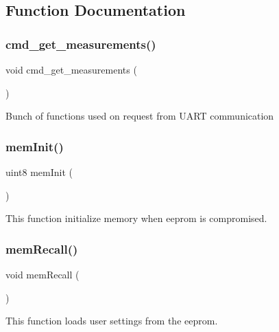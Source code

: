 \subsection{Function Documentation}
\mbox{\label{command__processing_8c_af5ccd403f1d3e49c97bafd6e7713cff3}} 
\subsubsection{cmd\+\_\+get\+\_\+measurements()}
{\footnotesize\ttfamily void cmd\+\_\+get\+\_\+measurements (\begin{DoxyParamCaption}{ }\end{DoxyParamCaption})}

Bunch of functions used on request from U\+A\+RT communication \mbox{\label{command__processing_8c_afe52941f8bc21271e811fb0d9f265f38}} 
\subsubsection{mem\+Init()}
{\footnotesize\ttfamily uint8 mem\+Init (\begin{DoxyParamCaption}{ }\end{DoxyParamCaption})}

This function initialize memory when eeprom is compromised. \mbox{\label{command__processing_8c_a3d3b232874d20b4317e9a79cc3c328d9}} 
\subsubsection{mem\+Recall()}
{\footnotesize\ttfamily void mem\+Recall (\begin{DoxyParamCaption}{ }\end{DoxyParamCaption})}

This function loads user settings from the eeprom. \mbox{\label{command__processing_8c_abdb69a74e3147f28d6cbd2b1d406c8a9}} 
